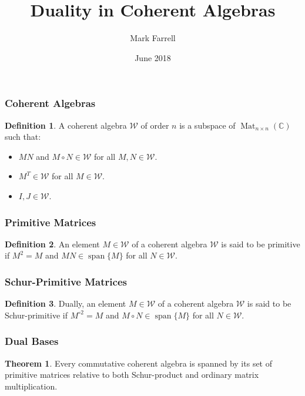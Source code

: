 \documentclass[notheorems]{beamer}
\title{Duality in Coherent Algebras}
\author{Mark Farrell}
\date{June 2018}
\theoremstyle{definition} %
\newtheorem{definition}{Definition}[section] %
\newtheorem{theorem}{Theorem}[section]
\begin{document}
\begin{frame}
\titlepage
\end{frame}

\begin{frame}

\frametitle{Coherent Algebras}

	\begin{definition}

		  A coherent algebra $\mathcal{W}$ of order $n$ is a subspace of $\operatorname{Mat}_{n \times n}(\mathbb{C})$ such that:

		  \begin{itemize}
		  	\item $M N$ and $M \circ N \in \mathcal{W}$ for all $M, N \in \mathcal{W}$.
		  	\item $M^{T} \in \mathcal{W}$ for all $M \in \mathcal{W}$.
		  	\item $I, J \in \mathcal{W}$.
		  \end{itemize}

  \end{definition}

\end{frame}

\begin{frame}

\frametitle{Primitive Matrices}

	\begin{definition}
		An element $M \in \mathcal{W}$ of a coherent algebra $\mathcal{W}$ is said to be primitive if $M^{2} = M$ and $M N \in \operatorname{span} \{ M \}$ for all $N \in \mathcal{W}$.
	\end{definition}

\end{frame}

\begin{frame}

\frametitle{Schur-Primitive Matrices}

	\begin{definition}
		Dually, an element $M \in \mathcal{W}$ of a coherent algebra $\mathcal{W}$ is said to be Schur-primitive if $M^{\circ 2} = M$ and $M \circ N \in \operatorname{span} \{ M \}$ for all $N \in \mathcal{W}$.
	\end{definition}

\end{frame}

\begin{frame}

\frametitle{Dual Bases}


	\begin{theorem}
	Every commutative coherent algebra is spanned by its set of primitive matrices relative to both Schur-product and ordinary matrix multiplication.
	\end{theorem}

\end{frame}
\end{document}
